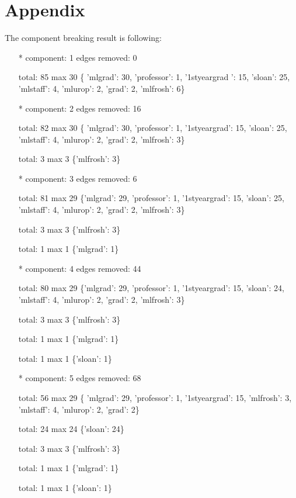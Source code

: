 \documentclass[11pt]{article}
\begin{document}
\section{Appendix}\label{appendix}
The component breaking result is following:
\begin{itemize}
\item[*]
component: 1 edges removed: 0

total: 85 max 30
\{ 'mlgrad': 30, 'professor': 1, '1styeargrad ': 15,  'sloan': 25, 'mlstaff': 4, 'mlurop': 2, 'grad': 2, 'mlfrosh': 6\}

\item[*]
component: 2 edges removed: 16

total: 82 max 30
\{ 'mlgrad': 30, 'professor': 1, '1styeargrad': 15,  'sloan': 25, 'mlstaff': 4, 'mlurop': 2, 'grad': 2, 'mlfrosh': 3\}

total: 3 max 3
\{'mlfrosh': 3\}

\item[*]
component: 3 edges removed: 6

total: 81 max 29
\{'mlgrad': 29, 'professor': 1, '1styeargrad': 15, 'sloan': 25, 'mlstaff': 4, 'mlurop': 2, 'grad': 2, 'mlfrosh': 3\}

total: 3 max 3
\{'mlfrosh': 3\}

total: 1 max 1
\{'mlgrad': 1\}

\item[*]
component: 4 edges removed: 44

total: 80 max 29
\{'mlgrad': 29, 'professor': 1, '1styeargrad': 15, 'sloan': 24, 'mlstaff': 4, 'mlurop': 2, 'grad': 2, 'mlfrosh': 3\}

total: 3 max 3
\{'mlfrosh': 3\}

total: 1 max 1
\{'mlgrad': 1\}

total: 1 max 1
\{'sloan': 1\}

\item[*]
component: 5 edges removed: 68

total: 56 max 29
\{ 'mlgrad': 29, 'professor': 1, '1styeargrad': 15, 'mlfrosh': 3, 'mlstaff': 4, 'mlurop': 2, 'grad': 2\}

total: 24 max 24
\{'sloan': 24\}

total: 3 max 3
\{'mlfrosh': 3\}

total: 1 max 1
\{'mlgrad': 1\}

total: 1 max 1
\{'sloan': 1\}
\end{itemize}

%

\end{document}
